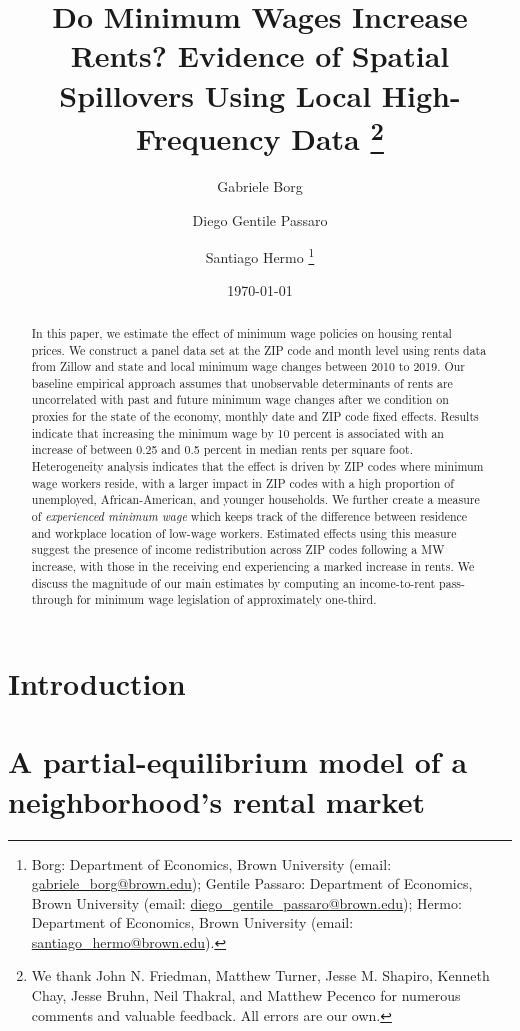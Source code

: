 \documentclass{article}
\title{ Do Minimum Wages Increase Rents? 
        Evidence of Spatial Spillovers Using Local High-Frequency Data
        \thanks{We thank John N. Friedman, Matthew Turner, Jesse M. Shapiro, 
        Kenneth Chay, Jesse Bruhn, Neil Thakral, and Matthew Pecenco for numerous 
        comments and valuable feedback. All errors are our own.}}
\author{Gabriele Borg \and Diego Gentile Passaro \and Santiago Hermo
        \footnote{
        Borg: Department of Economics, Brown University 
        (email: \url{gabriele_borg@brown.edu}); 
        Gentile Passaro: Department of Economics, Brown University 
        (email: \url{diego_gentile_passaro@brown.edu}); 
        Hermo: Department of Economics, Brown University 
        (email: \url{santiago_hermo@brown.edu}).}}
\date{\today}
\begin{document}
\maketitle

\begin{abstract}
    \noindent
    In this paper, we estimate the effect of minimum wage policies on housing rental 
    prices. We construct a panel data set at the ZIP code and month level using rents 
    data from Zillow and state and local minimum wage changes between 2010 to 2019. 
    Our baseline empirical approach assumes that unobservable determinants of rents 
    are uncorrelated with past and future minimum wage changes after we condition on 
    proxies for the state of the economy, monthly date and ZIP code fixed effects. 
    Results indicate that increasing the minimum wage by 10 percent is associated with 
    an increase of between 0.25 and 0.5 percent in median rents per square foot. 
    Heterogeneity analysis indicates that the effect is driven by ZIP codes where minimum 
    wage workers reside, with a larger impact in ZIP codes with a high proportion of 
    unemployed, African-American, and younger households. 
    We further create a measure of \textit{experienced minimum wage} which keeps track 
    of the difference between residence and workplace location of low-wage workers. 
    Estimated effects using this measure suggest the presence of income redistribution 
    across ZIP codes following a MW increase, with those in the receiving end 
    experiencing a marked increase in rents. 
    We discuss the magnitude of our main estimates by computing an income-to-rent 
    pass-through for minimum wage legislation of approximately one-third.
\end{abstract}

\vspace{5mm}

\maketitle


\clearpage

\section{Introduction}\label{sec:intro}
    

\section{A partial-equilibrium model of a neighborhood's rental market}\label{sec:data}
	
\end{document}
